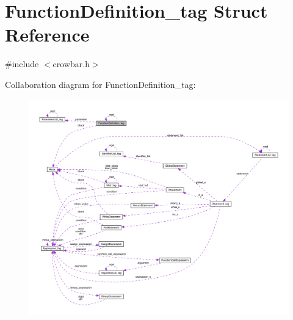 \hypertarget{struct_function_definition__tag}{}\section{Function\+Definition\+\_\+tag Struct Reference}
\label{struct_function_definition__tag}


{\ttfamily \#include $<$crowbar.\+h$>$}



Collaboration diagram for Function\+Definition\+\_\+tag\+:\nopagebreak
\begin{figure}[H]
\begin{center}
\leavevmode
\includegraphics[width=350pt]{struct_function_definition__tag__coll__graph}
\end{center}
\end{figure}
